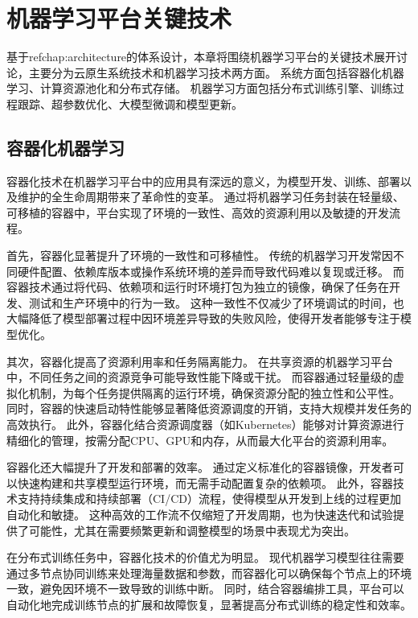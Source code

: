 
\chapter{机器学习平台关键技术}

基于ref{chap:architecture}的体系设计，本章将围绕机器学习平台的关键技术展开讨论，主要分为云原生系统技术和机器学习技术两方面。
系统方面包括容器化机器学习、计算资源池化和分布式存储。
机器学习方面包括分布式训练引擎、训练过程跟踪、超参数优化、大模型微调和模型更新。


\section{容器化机器学习}

容器化技术在机器学习平台中的应用具有深远的意义，为模型开发、训练、部署以及维护的全生命周期带来了革命性的变革。
通过将机器学习任务封装在轻量级、可移植的容器中，平台实现了环境的一致性、高效的资源利用以及敏捷的开发流程。

首先，容器化显著提升了环境的一致性和可移植性。
传统的机器学习开发常因不同硬件配置、依赖库版本或操作系统环境的差异而导致代码难以复现或迁移。
而容器技术通过将代码、依赖项和运行时环境打包为独立的镜像，确保了任务在开发、测试和生产环境中的行为一致。
这种一致性不仅减少了环境调试的时间，也大幅降低了模型部署过程中因环境差异导致的失败风险，使得开发者能够专注于模型优化。

其次，容器化提高了资源利用率和任务隔离能力。
在共享资源的机器学习平台中，不同任务之间的资源竞争可能导致性能下降或干扰。
而容器通过轻量级的虚拟化机制，为每个任务提供隔离的运行环境，确保资源分配的独立性和公平性。
同时，容器的快速启动特性能够显著降低资源调度的开销，支持大规模并发任务的高效执行。
此外，容器化结合资源调度器（如Kubernetes）能够对计算资源进行精细化的管理，按需分配CPU、GPU和内存，从而最大化平台的资源利用率。

容器化还大幅提升了开发和部署的效率。
通过定义标准化的容器镜像，开发者可以快速构建和共享模型运行环境，而无需手动配置复杂的依赖项。
此外，容器技术支持持续集成和持续部署（CI/CD）流程，使得模型从开发到上线的过程更加自动化和敏捷。
这种高效的工作流不仅缩短了开发周期，也为快速迭代和试验提供了可能性，尤其在需要频繁更新和调整模型的场景中表现尤为突出。

在分布式训练任务中，容器化技术的价值尤为明显。
现代机器学习模型往往需要通过多节点协同训练来处理海量数据和参数，而容器化可以确保每个节点上的环境一致，避免因环境不一致导致的训练中断。
同时，结合容器编排工具，平台可以自动化地完成训练节点的扩展和故障恢复，显著提高分布式训练的稳定性和效率。

